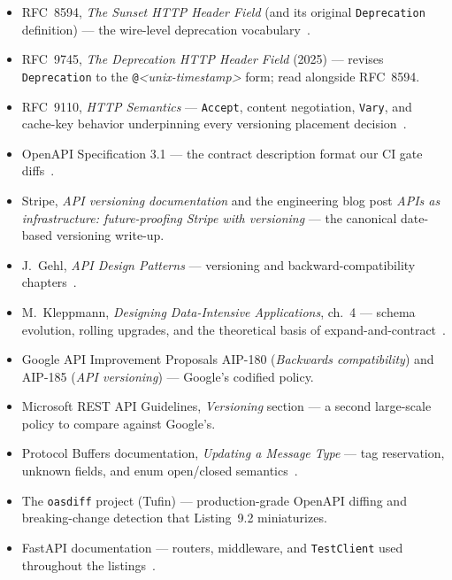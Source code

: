 \begin{itemize}
  \item RFC~8594, \emph{The Sunset HTTP Header Field} (and its original
        \texttt{Deprecation} definition) --- the wire-level deprecation
        vocabulary~\cite{rfc8594}.
  \item RFC~9745, \emph{The Deprecation HTTP Header Field} (2025) ---
        revises \texttt{Deprecation} to the \texttt{@}\emph{<unix-timestamp>}
        form; read alongside RFC~8594.
  \item RFC~9110, \emph{HTTP Semantics} --- \texttt{Accept}, content
        negotiation, \texttt{Vary}, and cache-key behavior underpinning every
        versioning placement decision~\cite{rfc9110}.
  \item OpenAPI Specification 3.1 --- the contract description format our CI
        gate diffs~\cite{openapi31}.
  \item Stripe, \emph{API versioning documentation} and the engineering blog
        post \emph{APIs as infrastructure: future-proofing Stripe with
        versioning} --- the canonical date-based versioning write-up.
  \item J.~Gehl, \emph{API Design Patterns} --- versioning and
        backward-compatibility chapters~\cite{gehl2021apidesign}.
  \item M.~Kleppmann, \emph{Designing Data-Intensive Applications}, ch.~4 ---
        schema evolution, rolling upgrades, and the theoretical basis of
        expand-and-contract~\cite{kleppmann2017ddia}.
  \item Google API Improvement Proposals AIP-180 (\emph{Backwards
        compatibility}) and AIP-185 (\emph{API versioning}) --- Google's
        codified policy.
  \item Microsoft REST API Guidelines, \emph{Versioning} section --- a
        second large-scale policy to compare against Google's.
  \item Protocol Buffers documentation, \emph{Updating a Message Type} ---
        tag reservation, unknown fields, and enum open/closed
        semantics~\cite{protobufdocs}.
  \item The \texttt{oasdiff} project (Tufin) --- production-grade OpenAPI
        diffing and breaking-change detection that Listing~9.2 miniaturizes.
  \item FastAPI documentation --- routers, middleware, and
        \texttt{TestClient} used throughout the listings~\cite{fastapidocs}.
\end{itemize}

